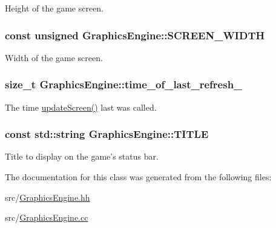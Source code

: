 Height of the game screen. 

\hypertarget{classGraphicsEngine_ac243d365dcf3e8a14f8ff1a838479429}{
\subsubsection[{S\-C\-R\-E\-E\-N\-\_\-\-W\-I\-D\-T\-H}]{\setlength{\rightskip}{0pt plus 5cm}const unsigned Graphics\-Engine\-::\-S\-C\-R\-E\-E\-N\-\_\-\-W\-I\-D\-T\-H\hspace{0.3cm}{\ttfamily [private]}}}\label{classGraphicsEngine_ac243d365dcf3e8a14f8ff1a838479429}


Width of the game screen. 

\hypertarget{classGraphicsEngine_a03732739efdf1f24a3bda1a202b6b866}{
\subsubsection[{time\-\_\-of\-\_\-last\-\_\-refresh\-\_\-}]{\setlength{\rightskip}{0pt plus 5cm}size\-\_\-t Graphics\-Engine\-::time\-\_\-of\-\_\-last\-\_\-refresh\-\_\-\hspace{0.3cm}{\ttfamily [private]}}}\label{classGraphicsEngine_a03732739efdf1f24a3bda1a202b6b866}


The time \hyperlink{classGraphicsEngine_aeadd04c5518ef05b039241cbb7d09b59}{update\-Screen()} last was called. 

\hypertarget{classGraphicsEngine_afc40023b292929b8b8e53c58b7e8f574}{
\subsubsection[{T\-I\-T\-L\-E}]{\setlength{\rightskip}{0pt plus 5cm}const std\-::string Graphics\-Engine\-::\-T\-I\-T\-L\-E\hspace{0.3cm}{\ttfamily [private]}}}\label{classGraphicsEngine_afc40023b292929b8b8e53c58b7e8f574}


Title to display on the game's status bar. 



The documentation for this class was generated from the following files\-:\begin{DoxyCompactItemize}
\item 
src/\hyperlink{GraphicsEngine_8hh}{Graphics\-Engine.\-hh}\item 
src/\hyperlink{GraphicsEngine_8cc}{Graphics\-Engine.\-cc}\end{DoxyCompactItemize}
